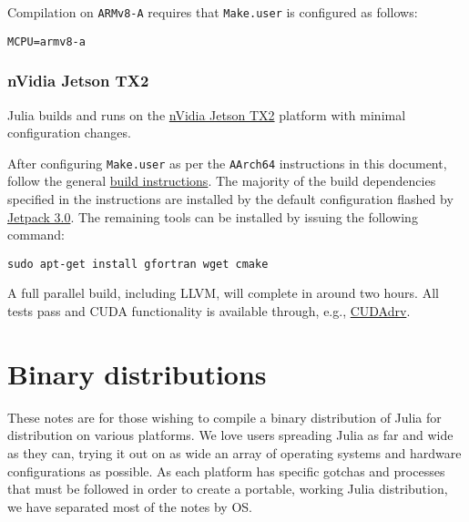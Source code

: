 Compilation on \texttt{ARMv8-A} requires that \texttt{Make.user} is configured as follows:




\begin{lstlisting}
MCPU=armv8-a
\end{lstlisting}



\hypertarget{1712927129164502401}{}


\subsubsection{nVidia Jetson TX2}



Julia builds and runs on the \href{https://www.nvidia.com/object/embedded-systems-dev-kits-modules.html}{nVidia Jetson TX2} platform with minimal configuration changes.



After configuring \texttt{Make.user} as per the \texttt{AArch64} instructions in this document, follow the general \href{https://github.com/JuliaLang/julia/blob/master/README.md}{build instructions}. The majority of the build dependencies specified in the instructions are installed by the default configuration flashed by \href{https://developer.nvidia.com/embedded/jetpack}{Jetpack 3.0}. The remaining tools can be installed by issuing the following command:




\begin{lstlisting}
sudo apt-get install gfortran wget cmake
\end{lstlisting}



A full parallel build, including LLVM, will complete in around two hours. All tests pass and CUDA functionality is available through, e.g., \href{https://github.com/JuliaGPU/CUDAdrv.jl}{CUDAdrv}.



\hypertarget{10368093425134318336}{}


\section{Binary distributions}



These notes are for those wishing to compile a binary distribution of Julia for distribution on various platforms.  We love users spreading Julia as far and wide as they can, trying it out on as wide an array of operating systems and hardware configurations as possible.  As each platform has specific gotchas and processes that must be followed in order to create a portable, working Julia distribution, we have separated most of the notes by OS.



